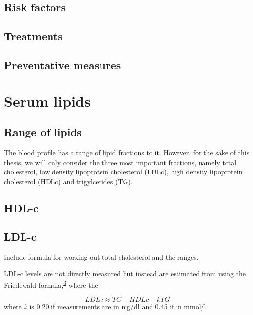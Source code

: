 \documentclass[a4paper, twoside]{templates/ociamthesis}
\begin{document}
\hypertarget{risk-factors}{%
\subsection{Risk factors}\label{risk-factors}}

\hypertarget{treatments}{%
\subsection{Treatments}\label{treatments}}

\hypertarget{preventative-measures}{%
\subsection{Preventative measures}\label{preventative-measures}}

\hypertarget{serum-lipids}{%
\section{Serum lipids}\label{serum-lipids}}

\hypertarget{range-of-lipids}{%
\subsection{Range of lipids}\label{range-of-lipids}}

The blood profile has a range of lipid fractions to it. However, for the sake of this thesis, we will only consider the three most important fractions, namely total cholesterol, low density lipoprotein cholesterol (LDLc), high density lipoprotein cholesterol (HDLc) and trigylcerides (TG).

\hypertarget{hdl-c}{%
\subsection{HDL-c}\label{hdl-c}}

\hypertarget{ldl-c}{%
\subsection{LDL-c}\label{ldl-c}}

Include formula for working out total cholesterol and the ranges.

LDL-c levels are not directly measured but instead are estimated from using the Friedewald formula,\textsuperscript{\protect\hyperlink{ref-friedewald1972}{3}} where the :

\[LDLc \approx TC - HDLc - kTG\]
where \(k\) is 0.20 if measurements are in mg/dl and 0.45 if in mmol/l.
\end{document}
